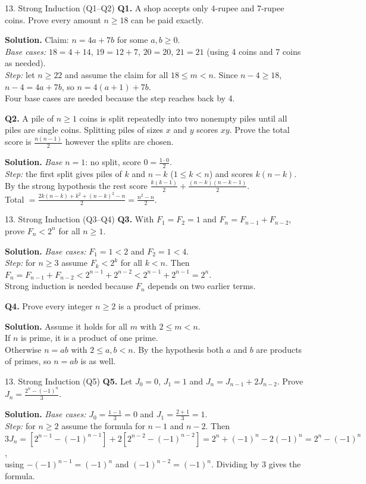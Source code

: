 \documentclass[aspectratio=169,10pt]{beamer}
\newcommand{\qa}[3]{%
  \textbf{Q#1.} #2\par\smallskip
  {\color{ans}\textbf{Solution.} #3}\par\vspace{6pt}}
\begin{document}
\begin{frame}{13. Strong Induction (Q1--Q2)}
\footnotesize
\qa{1}{A shop accepts only 4-rupee and 7-rupee coins. Prove every amount $n\ge18$ can be paid exactly.}
{Claim: $n=4a+7b$ for some $a,b\ge0$.\\
\emph{Base cases:} $18=4+14$, $19=12+7$, $20=20$, $21=21$ (using 4 coins and 7 coins as needed).\\
\emph{Step:} let $n\ge22$ and assume the claim for all $18\le m<n$. Since $n-4\ge18$, $n-4=4a+7b$, so $n=4(a+1)+7b$.\\
Four base cases are needed because the step reaches back by 4.}
\qa{2}{A pile of $n\ge1$ coins is split repeatedly into two nonempty piles until all piles are single coins. Splitting piles of sizes $x$ and $y$ scores $xy$. Prove the total score is $\frac{n(n-1)}{2}$ however the splits are chosen.}
{\emph{Base} $n=1$: no split, score $0=\frac{1\cdot0}{2}$.\\
\emph{Step:} the first split gives piles of $k$ and $n-k$ ($1\le k<n$) and scores $k(n-k)$. By the strong hypothesis the rest score $\frac{k(k-1)}{2}+\frac{(n-k)(n-k-1)}{2}$.\\
Total $=\frac{2k(n-k)+k^2+(n-k)^2-n}{2}=\frac{n^2-n}{2}$.}
\end{frame}

\begin{frame}{13. Strong Induction (Q3--Q4)}
\footnotesize
\qa{3}{With $F_1=F_2=1$ and $F_n=F_{n-1}+F_{n-2}$, prove $F_n<2^n$ for all $n\ge1$.}
{\emph{Base cases:} $F_1=1<2$ and $F_2=1<4$.\\
\emph{Step:} for $n\ge3$ assume $F_k<2^k$ for all $k<n$. Then $F_n=F_{n-1}+F_{n-2}<2^{n-1}+2^{n-2}<2^{n-1}+2^{n-1}=2^n$.\\
Strong induction is needed because $F_n$ depends on two earlier terms.}
\qa{4}{Prove every integer $n\ge2$ is a product of primes.}
{Assume it holds for all $m$ with $2\le m<n$.\\
If $n$ is prime, it is a product of one prime.\\
Otherwise $n=ab$ with $2\le a,b<n$. By the hypothesis both $a$ and $b$ are products of primes, so $n=ab$ is as well.}
\end{frame}

\begin{frame}{13. Strong Induction (Q5)}
\footnotesize
\qa{5}{Let $J_0=0$, $J_1=1$ and $J_n=J_{n-1}+2J_{n-2}$. Prove $J_n=\frac{2^n-(-1)^n}{3}$.}
{\emph{Base cases:} $J_0=\frac{1-1}{3}=0$ and $J_1=\frac{2+1}{3}=1$.\\
\emph{Step:} for $n\ge2$ assume the formula for $n-1$ and $n-2$. Then\\
$3J_n=[2^{n-1}-(-1)^{n-1}]+2[2^{n-2}-(-1)^{n-2}]=2^n+(-1)^n-2(-1)^n=2^n-(-1)^n$,\\
using $-(-1)^{n-1}=(-1)^n$ and $(-1)^{n-2}=(-1)^n$. Dividing by 3 gives the formula.}
\end{frame}
\end{document}
